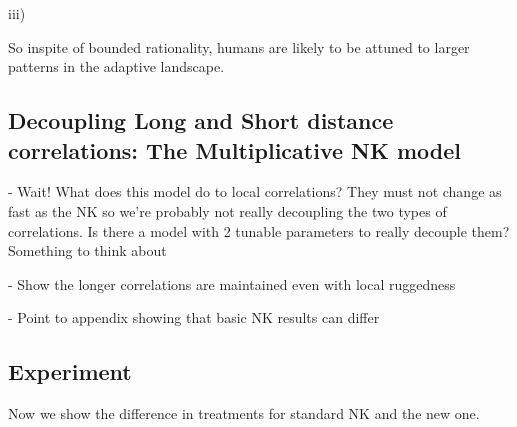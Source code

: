 \documentclass[12pt]{article}
\begin{document}
  iii)

So inspite of bounded rationality, humans are likely to be attuned to larger patterns in the adaptive landscape.

\subsection*{Decoupling Long and Short distance correlations: The Multiplicative NK model}

- Wait! What does this model do to local correlations? They must not change as fast as the NK so we're probably not really decoupling the two types of correlations. Is there a model with 2 tunable parameters to really decouple them? Something to think about

- Show the longer correlations are maintained even with local ruggedness

-  Point to appendix showing that basic NK results can differ

\subsection*{Experiment}

Now we show the difference in treatments for standard NK and the new one. 




\end{document}
